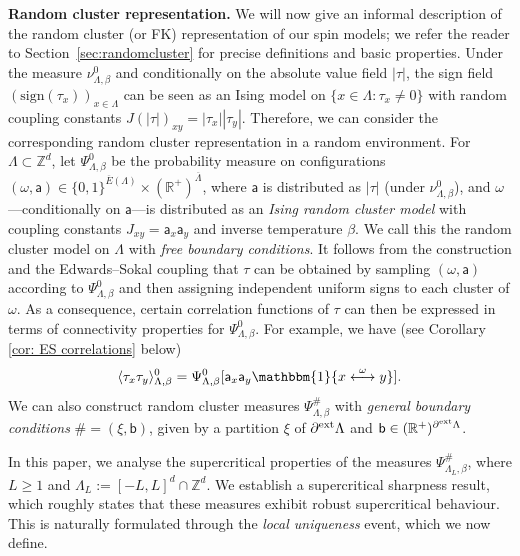 \documentclass[11pt,a4paper]{article}
\numberwithin{equation}{section}
\theoremstyle{plain}
\theoremstyle{definition}
\begin{document}
\noindent\textbf{Random cluster representation.} We will now give an informal description of the random cluster (or FK) representation of our spin models; we refer the reader to Section~\ref{sec:randomcluster} for precise definitions and basic properties. 
Under the measure $\nu_{\Lambda,\beta}^0$ and conditionally on the absolute value field $|\tau|$, the sign field $(\mathrm{sign}(\tau_x))_{x\in \Lambda}$ can be seen as an Ising model on $\{x\in \Lambda: \tau_x\neq 0\}$ with random coupling constants $J(|\tau|)_{xy}= |\tau_x||\tau_y|$. Therefore, we can consider the corresponding random cluster representation in a random environment. For $\Lambda\subset \mathbb{Z}^d$, let $\Psi_{\Lambda,\beta}^0$ be the probability measure on configurations $(\omega,\mathsf{a})\in \{0,1\}^{\overline{E}(\Lambda)} \times (\mathbb R^+)^{\overline{\Lambda}}$, where $\mathsf{a}$ is distributed as $|\tau|$ (under $\nu_{\Lambda,\beta}^0$), and $\omega$---conditionally on $\mathsf{a}$---is distributed as an \emph{Ising random cluster model} with coupling constants $J_{xy}=\mathsf{a}_x \mathsf{a}_y$ and inverse temperature $\beta$. We call this the random cluster model on $\Lambda$ with \emph{free boundary conditions}. It follows from the construction and the Edwards--Sokal coupling that $\tau$ can be obtained by sampling $(\omega,\mathsf{a})$ according to $\Psi_{\Lambda,\beta}^0$ and then assigning independent uniform signs to each cluster of $\omega$. As a consequence, certain correlation functions of $\tau$ can then be expressed in terms of connectivity properties for $\Psi_{\Lambda,\beta}^0$. For example, we have (see Corollary \ref{cor: ES correlations} below)
\begin{equation}
\langle \tau_x \tau_y\rangle^0_{\Lambda,\beta}= \Psi_{\Lambda,\beta}^0[ \mathsf{a}_x \mathsf{a}_y \mathbbm{1}\{x \overset{\omega}{\longleftrightarrow} y\}].    
\end{equation}
We can also construct random cluster measures $\Psi^\#_{\Lambda,\beta}$ with \emph{general boundary conditions} $\#=(\xi,\mathsf{b})$, given by a partition $\xi$ of $\partial^{\textup{ext}}\Lambda$ and $\mathsf{b}\in (\mathbb{R}^+)^{\partial^{\textup{ext}}\Lambda}$. 



\hfill

In this paper, we analyse the supercritical properties of the measures 
$\Psi_{\Lambda_L, \beta}^\#$, where $L \geq 1$ and $\Lambda_L := [-L, L]^d \cap \mathbb{Z}^d$. We establish a supercritical sharpness result, which roughly states that these measures exhibit robust supercritical behaviour. This is naturally formulated through the \emph{local uniqueness} event, which we now define.
\end{document}
